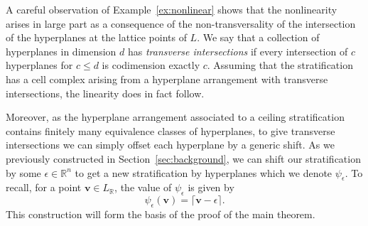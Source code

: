 \documentclass{amsart}
\newcommand{\RR}{\mathbb{R}}
\theoremstyle{remark}
\begin{document}
A careful observation of Example~\ref{ex:nonlinear} shows that the nonlinearity arises in large part as a consequence of the non-transversality of the intersection of the hyperplanes at the lattice points of $L$.
We say that a collection of hyperplanes in dimension $d$ has \emph{transverse intersections} if every intersection of $c$ hyperplanes for $c\leq d$ is codimension exactly $c$. Assuming that the stratification has a cell complex arising from a hyperplane arrangement with transverse intersections, the linearity does in fact follow. 

Moreover, as the hyperplane arrangement associated to a ceiling stratification contains finitely many equivalence classes of hyperplanes, to give transverse intersections we can simply offset each hyperplane by a generic shift. As we previously constructed in Section~\ref{sec:background}, we can shift our stratification by some $\epsilon\in \RR^{n}$ to get a new stratification by hyperplanes which we denote $\psi_\epsilon$.
To recall, for a point  $\bm{v}\in L_{\RR}$, the value of $\psi_{\epsilon}$ is given by
\[\psi_{\epsilon}(\bm{v}) = \lceil \bm{v}-\epsilon \rceil.\]
This construction will form the basis of the proof of the main theorem.
\end{document}
